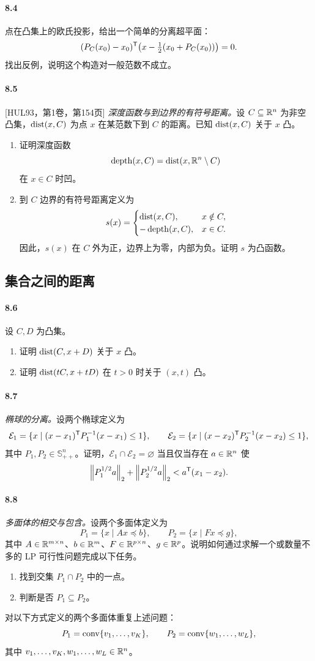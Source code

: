 \paragraph{8.4}点在凸集上的欧氏投影，给出一个简单的分离超平面：
\[(P_C(x_0)-x_0)^\mathsf T\bigl(x-\tfrac12(x_0+P_C(x_0))\bigr)=0.\]
找出反例，说明这个构造对一般范数不成立。
\paragraph{8.5}[HUL93，第1卷，第154页] \textit{深度函数与到边界的有符号距离。}设 $C\subseteq\mathbb R^n$ 为非空凸集，$\operatorname{dist}(x,C)$ 为点 $x$ 在某范数下到 $C$ 的距离。已知 $\operatorname{dist}(x,C)$ 关于 $x$ 凸。
\begin{enumerate}[label=(\alph*)]
\item 证明深度函数
\[\operatorname{depth}(x,C)=\operatorname{dist}(x,\mathbb R^n\setminus C)\]
在 $x\in C$ 时凹。
\item 到 $C$ 边界的有符号距离定义为
\[s(x)=\begin{cases}\operatorname{dist}(x,C),&x\notin C,\\-\operatorname{depth}(x,C),&x\in C.\end{cases}\]
因此，$s(x)$ 在 $C$ 外为正，边界上为零，内部为负。证明 $s$ 为凸函数。
\end{enumerate}
\subsection*{集合之间的距离}
\paragraph{8.6}设 $C,D$ 为凸集。
\begin{enumerate}[label=(\alph*)]
\item 证明 $\operatorname{dist}(C,x+D)$ 关于 $x$ 凸。
\item 证明 $\operatorname{dist}(tC,x+tD)$ 在 $t>0$ 时关于 $(x,t)$ 凸。
\end{enumerate}
\paragraph{8.7}\textit{椭球的分离。}设两个椭球定义为
\[\mathcal E_1=\{x\mid(x-x_1)^\mathsf T P_1^{-1}(x-x_1)\leq1\},\qquad
 \mathcal E_2=\{x\mid(x-x_2)^\mathsf T P_2^{-1}(x-x_2)\leq1\},\]
其中 $P_1,P_2\in\mathbb S_{++}^n$。证明，$\mathcal E_1\cap\mathcal E_2=\varnothing$ 当且仅当存在 $a\in\mathbb R^n$ 使
\[\left\lVert P_1^{1/2}a\right\rVert_2+\left\lVert P_2^{1/2}a\right\rVert_2<a^\mathsf T(x_1-x_2).\]
\paragraph{8.8}\textit{多面体的相交与包含。}设两个多面体定义为
\[P_1=\{x\mid Ax\preceq b\},\qquad P_2=\{x\mid Fx\preceq g\},\]
其中 $A\in\mathbb R^{m\times n}$、$b\in\mathbb R^m$、$F\in\mathbb R^{p\times n}$、$g\in\mathbb R^p$。说明如何通过求解一个或数量不多的 LP 可行性问题完成以下任务。
\begin{enumerate}[label=(\alph*)]
\item 找到交集 $P_1\cap P_2$ 中的一点。
\item 判断是否 $P_1\subseteq P_2$。
\end{enumerate}
对以下方式定义的两个多面体重复上述问题：
\[P_1=\operatorname{conv}\{v_1,\ldots,v_K\},\qquad P_2=\operatorname{conv}\{w_1,\ldots,w_L\},\]
其中 $v_1,\ldots,v_K,w_1,\ldots,w_L\in\mathbb R^n$。
